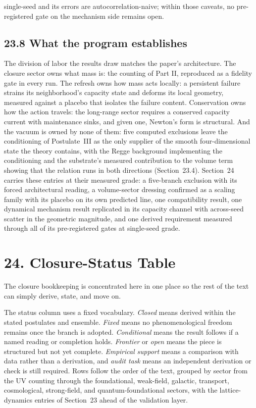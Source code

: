 \documentclass[11pt]{article}
\begin{document}
single-seed and its errors are autocorrelation-naive; within those caveats, no pre-registered gate on the mechanism side remains open.

\subsection{23.8 What the program establishes}

The division of labor the results draw matches the paper's architecture. The closure sector owns what mass is: the counting of Part II, reproduced as a fidelity gate in every run. The refresh owns how mass acts locally: a persistent failure strains its neighborhood's capacity state and deforms its local geometry, measured against a placebo that isolates the failure content. Conservation owns how the action travels: the long-range sector requires a conserved capacity current with maintenance sinks, and given one, Newton's form is structural. And the vacuum is owned by none of them: five computed exclusions leave the conditioning of Postulate~III as the only supplier of the smooth four-dimensional state the theory contains, with the Regge background implementing the conditioning and the substrate's measured contribution to the volume term showing that the relation runs in both directions (Section~23.4). Section~24 carries these entries at their measured grade: a five-branch exclusion with its forced architectural reading, a volume-sector dressing confirmed as a scaling family with its placebo on its own predicted line, one compatibility result, one dynamical mechanism result replicated in its capacity channel with across-seed scatter in the geometric magnitude, and one derived requirement measured through all of its pre-registered gates at single-seed grade.

\section{24. Closure-Status Table}

The closure bookkeeping is concentrated here in one place so the rest of the text can simply derive, state, and move on.

The status column uses a fixed vocabulary. \emph{Closed} means derived within the stated postulates and ensemble. \emph{Fixed} means no phenomenological freedom remains once the branch is adopted. \emph{Conditional} means the result follows if a named reading or completion holds. \emph{Frontier} or \emph{open} means the piece is structured but not yet complete. \emph{Empirical support} means a comparison with data rather than a derivation, and \emph{audit task} means an independent derivation or check is still required. Rows follow the order of the text, grouped by sector from the UV counting through the foundational, weak-field, galactic, transport, cosmological, strong-field, and quantum-foundational sectors, with the lattice-dynamics entries of Section~23 ahead of the validation layer.
\end{document}
